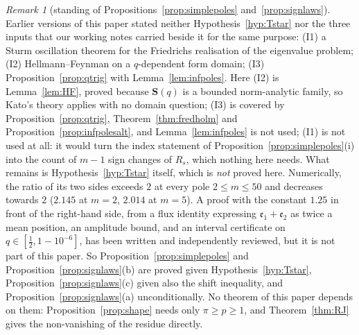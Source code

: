 \documentclass[11pt]{article}
\theoremstyle{plain}
\theoremstyle{definition}
\theoremstyle{remark}
\newtheorem{remark}[theorem]{Remark}
\begin{document}
\begin{remark}[standing of Propositions~\ref{prop:simplepoles} and~\ref{prop:signlaws}]\label{rem:spectralstanding}
Earlier versions of this paper stated neither Hypothesis~\ref{hyp:Tstar} nor the three inputs that
our working notes carried beside it for the same purpose: \textup{(I1)} a Sturm oscillation theorem
for the Friedrichs realisation of the eigenvalue problem; \textup{(I2)} Hellmann--Feynman on a
$q$-dependent form domain; \textup{(I3)} Proposition~\ref{prop:qtrig} with
Lemma~\ref{lem:infpoles}. Here \textup{(I2)} is Lemma~\ref{lem:HF}, proved because $\mathbf S(q)$ is
a bounded norm-analytic family, so Kato's theory applies with no domain question;
\textup{(I3)} is covered by Proposition~\ref{prop:qtrig}, Theorem~\ref{thm:fredholm} and
Proposition~\ref{prop:infpolesalt}, and Lemma~\ref{lem:infpoles} is not used; \textup{(I1)} is not used at all: it would turn the index
statement of Proposition~\ref{prop:simplepoles}\textup{(i)} into the count of $m-1$ sign changes of
$R_s$, which nothing here needs. What remains is Hypothesis~\ref{hyp:Tstar} itself, which is
\emph{not} proved here. Numerically, the ratio of its two sides exceeds $2$ at every pole
$2\le m\le50$ and decreases towards $2$ ($2.145$ at $m=2$, $2.014$ at $m=5$). A proof with the
constant $1.25$ in front of the right-hand side, from a flux identity expressing
$\mathfrak e_1+\mathfrak e_2$ as twice a mean position, an amplitude bound, and an interval
certificate on $q\in[\tfrac12,1-10^{-6}]$, has been written and independently reviewed, but it is
not part of this paper. So Proposition~\ref{prop:simplepoles} and
Proposition~\ref{prop:signlaws}\textup{(b)} are proved given Hypothesis~\ref{hyp:Tstar},
Proposition~\ref{prop:signlaws}\textup{(c)} given also the shift inequality, and
Proposition~\ref{prop:signlaws}\textup{(a)} unconditionally. No theorem of this paper depends on
them: Proposition~\ref{prop:shape} needs only $\pi\ge p\ge1$, and Theorem~\ref{thm:RJ} gives the
non-vanishing of the residue directly.
\end{remark}
\end{document}
